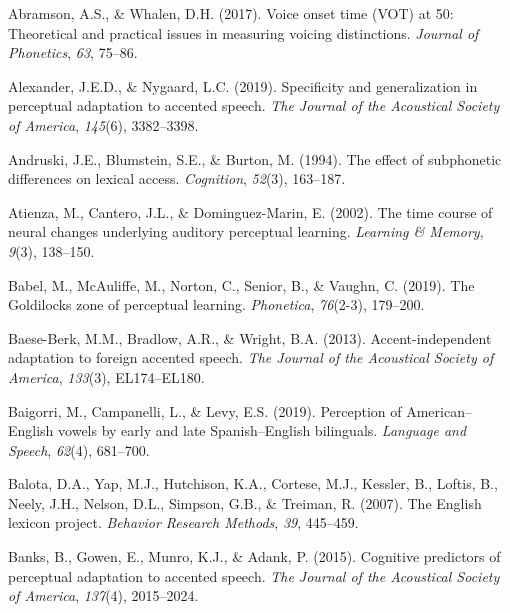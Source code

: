 \documentclass[
  12pt,
  twoside]{article}
\newlength{\cslhangindent}
\newlength{\cslentryspacingunit} %
\newenvironment{CSLReferences}[2] %
 {%
  \setlength{\parindent}{0pt}
  \ifodd #1
  \let\oldpar\par
  \def\par{\hangindent=\cslhangindent\oldpar}
  \fi
  \setlength{\parskip}{#2\cslentryspacingunit}
 }%
 {}
\begin{document}
\setlength{\parindent}{-0.2in}
\setlength{\leftskip}{0.2in}

\noindent

\hypertarget{refs}{}
\begin{CSLReferences}{1}{0}
\leavevmode{}%
Abramson, A.S., \& Whalen, D.H. (2017). Voice onset time ({VOT}) at 50: Theoretical and practical issues in measuring voicing distinctions. \emph{Journal of Phonetics}, \emph{63}, 75--86.

\leavevmode{}%
Alexander, J.E.D., \& Nygaard, L.C. (2019). Specificity and generalization in perceptual adaptation to accented speech. \emph{The Journal of the Acoustical Society of America}, \emph{145}(6), 3382--3398.

\leavevmode{}%
Andruski, J.E., Blumstein, S.E., \& Burton, M. (1994). The effect of subphonetic differences on lexical access. \emph{Cognition}, \emph{52}(3), 163--187.

\leavevmode{}%
Atienza, M., Cantero, J.L., \& Dominguez-Marin, E. (2002). The time course of neural changes underlying auditory perceptual learning. \emph{Learning \& Memory}, \emph{9}(3), 138--150.

\leavevmode{}%
Babel, M., McAuliffe, M., Norton, C., Senior, B., \& Vaughn, C. (2019). The {Goldilocks} zone of perceptual learning. \emph{Phonetica}, \emph{76}(2-3), 179--200.

\leavevmode{}%
Baese-Berk, M.M., Bradlow, A.R., \& Wright, B.A. (2013). Accent-independent adaptation to foreign accented speech. \emph{The Journal of the Acoustical Society of America}, \emph{133}(3), EL174--EL180.

\leavevmode{}%
Baigorri, M., Campanelli, L., \& Levy, E.S. (2019). Perception of {American}--{English} vowels by early and late {Spanish}--{English} bilinguals. \emph{Language and Speech}, \emph{62}(4), 681--700.

\leavevmode{}%
Balota, D.A., Yap, M.J., Hutchison, K.A., Cortese, M.J., Kessler, B., Loftis, B., Neely, J.H., Nelson, D.L., Simpson, G.B., \& Treiman, R. (2007). The {English} lexicon project. \emph{Behavior Research Methods}, \emph{39}, 445--459.

\leavevmode{}%
Banks, B., Gowen, E., Munro, K.J., \& Adank, P. (2015). Cognitive predictors of perceptual adaptation to accented speech. \emph{The Journal of the Acoustical Society of America}, \emph{137}(4), 2015--2024.


\end{CSLReferences}
\end{document}
